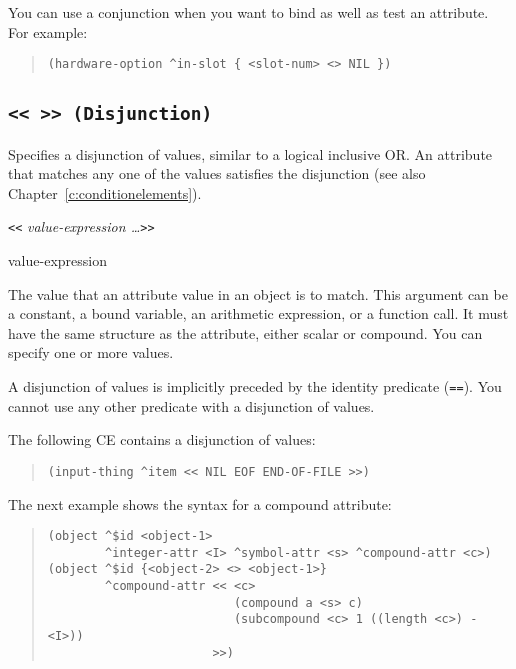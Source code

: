 You can use a conjunction when you want to bind as well as test an
attribute. For example:

\begin{quote}
\begin{verbatim}
(hardware-option ^in-slot { <slot-num> <> NIL })
\end{verbatim}
\end{quote}


\subsection{\tt{<<} \tt{>>} (Disjunction)}

Specifies a disjunction of values, similar to a logical inclusive
OR. An attribute that matches any one of the values satisfies the
disjunction (see also Chapter~\ref{c:conditionelements}).

\Format

\verb|<<| \it{value-expression} \ldots\verb|>>|

\begin{operands}
\item[value-expression]

  The value that an attribute value in an object is to match.  This
  argument can be a constant, a bound variable, an arithmetic
  expression, or a function call. It must have the same structure as
  the attribute, either scalar or compound.  You can specify one or
  more values.

  A disjunction of values is implicitly preceded by the identity
  predicate (\verb|==|). You cannot use any other predicate with a
  disjunction of values.
\end{operands}

\Example

The following CE contains a disjunction of values:

\begin{quote}
\begin{verbatim}
(input-thing ^item << NIL EOF END-OF-FILE >>)
\end{verbatim}
\end{quote}

The next example shows the syntax for a compound attribute:

\begin{quote}
\begin{verbatim}
(object ^$id <object-1>
        ^integer-attr <I> ^symbol-attr <s> ^compound-attr <c>)
(object ^$id {<object-2> <> <object-1>}
        ^compound-attr << <c>
                          (compound a <s> c)
                          (subcompound <c> 1 ((length <c>) - <I>))
                       >>)
\end{verbatim}
\end{quote}

